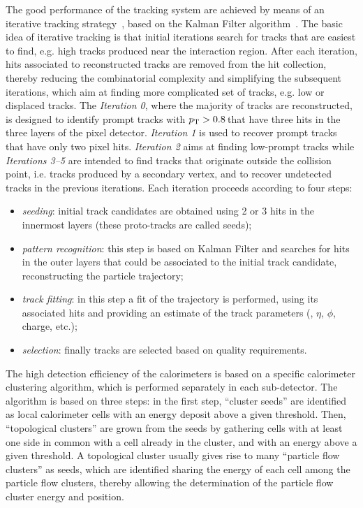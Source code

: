 The good performance of the tracking system are achieved by means of an iterative tracking strategy~\cite{Chatrchyan:2014fea}, based on the Kalman Filter algorithm~\cite{Billoir:1990we}. The basic idea of iterative tracking is that initial iterations search for tracks that are easiest to find, e.g. high \pt tracks produced near the interaction region. After each iteration, hits associated to reconstructed tracks are removed from the hit collection, thereby reducing the combinatorial complexity and simplifying the subsequent iterations, which aim at finding more complicated set of tracks, e.g. low \pt or displaced tracks. The \emph{Iteration 0}, where the majority of tracks are reconstructed, is designed to identify prompt tracks with $p_\mathrm{T}>0.8$\,\GeV that have three hits in the three layers of the pixel detector. \emph{Iteration 1} is used to recover prompt tracks that have only two pixel hits. \emph{Iteration 2} aims at finding low-\pt prompt tracks while \emph{Iterations 3--5} are intended to find tracks that originate outside the collision point, i.e. tracks produced by a secondary vertex, and to recover undetected tracks in the previous iterations. Each iteration proceeds according to four steps:
\begin{itemize}
\item \emph{seeding}: initial track candidates are obtained using 2 or 3 hits in the innermost layers (these proto-tracks are called seeds);
\item \emph{pattern recognition}: this step is based on Kalman Filter and searches for hits in the outer layers that could be associated to the initial track candidate, reconstructing the particle trajectory;
\item \emph{track fitting}: in this step a fit of the trajectory is performed, using its associated hits and providing an estimate of the track parameters (\pt, $\eta$, $\phi$, charge, etc.);
\item \emph{selection}: finally tracks are selected based on quality requirements.
\end{itemize}

The high detection efficiency of the calorimeters is based on a specific calorimeter clustering algorithm, which is performed separately in each sub-detector. The algorithm is based on three steps: in the first step, ``cluster seeds'' are identified as local calorimeter cells with an energy deposit above a given threshold. Then, ``topological clusters'' are grown from the seeds by gathering cells with at least one side in common with a cell already in the cluster, and with an energy above a given threshold. A topological cluster usually gives rise to many ``particle flow clusters'' as seeds, which are identified sharing the energy of each cell among the particle flow clusters, thereby allowing the determination of the particle flow cluster energy and position.

